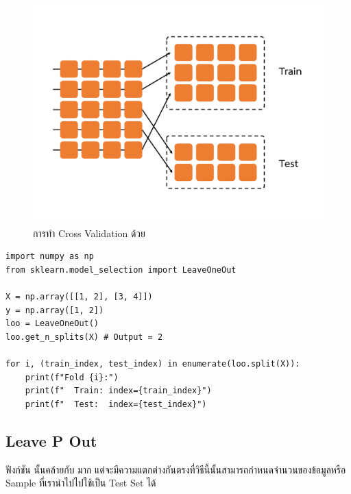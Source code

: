 \begin{figure}[H]
    \centering
    \includegraphics[width=0.9\linewidth,page=5]{fig/cross_validation.pdf}
    \caption{การทำ Cross Validation ด้วย }
    \label{fig:leave_one_out}
\end{figure}

\begin{lstlisting}[style=MyPython]
import numpy as np
from sklearn.model_selection import LeaveOneOut

X = np.array([[1, 2], [3, 4]])
y = np.array([1, 2])
loo = LeaveOneOut()
loo.get_n_splits(X) # Output = 2 

for i, (train_index, test_index) in enumerate(loo.split(X)):
    print(f"Fold {i}:")
    print(f"  Train: index={train_index}")
    print(f"  Test:  index={test_index}")
\end{lstlisting}

\subsection{Leave P Out}
\label{ssec:leave_p_out}

ฟังก์ชัน  นั้นคล้ายกับ  มาก แต่จะมีความแตกต่างกันตรงที่วิธีนี้นั้นสามารถกำหนดจำนวนของข้อมูลหรือ Sample ที่เรานำไปไปใช้เป็น Test Set ได้


